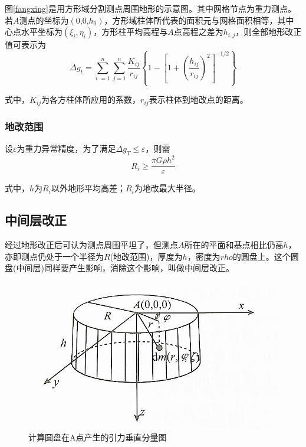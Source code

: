 \begin{enumerate}
	图\ref{fangxing}是用方形域分割测点周围地形的示意图。其中网格节点为重力测点。若$A$测点的坐标为$\left( \text{0,0,}h_0 \right)$，方形域柱体所代表的面积元与网格面积相等，其中心点水平坐标为$\left( \xi _i,\eta _i \right) $，方形柱平均高程与$A$点高程之差为$h_{i,j}$，则全部地形改正值可表示为
	\begin{equation}
		\varDelta g_t=\sum_{i\,\,=1}^n{\sum_{j=1}^n{\frac{K_{ij}}{r_{ij}}\left\{ 1-\left[ 1+\left( \frac{h_{ij}}{r_{ij}} \right) ^2 \right] ^{-\text{1/}2} \right\}}}
	\end{equation}
	
	式中，$K_{ij}$为各方柱体所应用的系数，$r_{ij}$表示柱体到地改点的距离。
\end{enumerate}
\subsubsection{地改范围}
设$\varepsilon $为重力异常精度，为了满足$\varDelta g_T\leqslant \varepsilon $，则需
\begin{equation}
R_i\geqslant \frac{\pi G\rho h^2}{\varepsilon}
\end{equation}

式中，$h$为$R_i$以外地形平均高差；$R_i$为地改最大半径。
\subsection{中间层改正}
经过地形改正后可认为测点周围平坦了，但测点$A$所在的平面和基点相比仍高$h$，亦即测点仍处于一个半径为$R$(地改范围)，厚度为$h$，密度为$rho$的圆盘上。这个圆盘(中间层)同样要产生影响，消除这个影响，叫做中间层改正。
\begin{figure}
	\centering
	\label{zjc}
	\includegraphics[scale = 0.7]{figures/mlayer.png}
	\caption{计算圆盘在A点产生的引力垂直分量图}
\end{figure}

